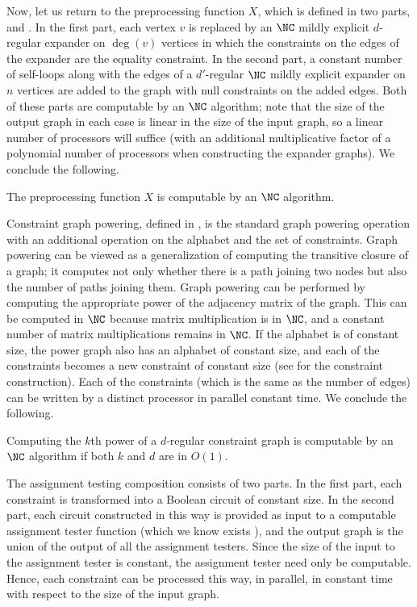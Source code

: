 Now, let us return to the preprocessing function $X$, which is defined in two parts, \autocite[Definition~4.1]{dinur07} and \autocite[Definition~4.2]{dinur07}.
In the first part, each vertex $v$ is replaced by an $\NC$ mildly explicit $d$-regular expander on $\deg(v)$ vertices in which the constraints on the edges of the expander are the equality constraint.
In the second part, a constant number of self-loops along with the edges of a $d'$-regular $\NC$ mildly explicit expander on $n$ vertices are added to the graph with null constraints on the added edges.
Both of these parts are computable by an $\NC$ algorithm; note that the size of the output graph in each case is linear in the size of the input graph, so a linear number of processors will suffice (with an additional multiplicative factor of a polynomial number of processors when constructing the expander graphs).
We conclude the following.

\begin{lemma}
  The preprocessing function $X$ is computable by an $\NC$ algorithm.
\end{lemma}

Constraint graph powering, defined in \autocite[Section~1.2]{dinur07}, is the standard graph powering operation with an additional operation on the alphabet and the set of constraints.
Graph powering can be viewed as a generalization of computing the transitive closure of a graph; it computes not only whether there is a path joining two nodes but also the number of paths joining them.
Graph powering can be performed by computing the appropriate power of the adjacency matrix of the graph.
This can be computed in $\NC$ because matrix multiplication is in $\NC$, and a constant number of matrix multiplications remains in $\NC$.
If the alphabet is of constant size, the power graph also has an alphabet of constant size, and each of the constraints becomes a new constraint of constant size (see \autocite[Section~1.2]{dinur07} for the constraint construction).
Each of the constraints (which is the same as the number of edges) can be written by a distinct processor in parallel constant time.
We conclude the following.

\begin{lemma}
  Computing the $k$th power of a $d$-regular constraint graph is computable by an $\NC$ algorithm if both $k$ and $d$ are in $O(1)$.
\end{lemma}

The assignment testing composition \autocite[Definition~5.1]{dinur07} consists of two parts.
In the first part, each constraint is transformed into a Boolean circuit of constant size.
In the second part, each circuit constructed in this way is provided as input to a computable assignment tester function (which we know exists \autocite[Theorem~5.1]{dinur07}), and the output graph is the union of the output of all the assignment testers.
Since the size of the input to the assignment tester is constant, the assignment tester need only be computable.
Hence, each constraint can be processed this way, in parallel, in constant time with respect to the size of the input graph.

